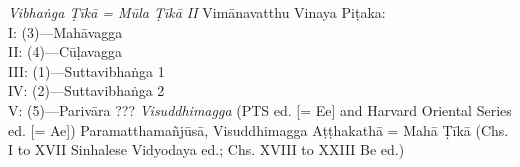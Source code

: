 \begin{thebibliography}{xxxxxxxxxxx}
 \emph{Vibhaṅga Ṭīkā = Mūla Ṭīkā II}
 Vimānavatthu
 Vinaya Piṭaka:\\ I: (3)—Mahāvagga \\ II: (4)—Cūḷavagga \\ III: (1)—Suttavibhaṅga 1 \\ IV: (2)—Suttavibhaṅga 2 \\ V: (5)—Parivāra
 ???
 \emph{Visuddhimagga} (PTS ed. [= Ee] and Harvard Oriental Series ed. [= Ae])
 Paramatthamañjūsā, Visuddhimagga Aṭṭhakathā = Mahā Ṭīkā (Chs. I to XVII Sinhalese Vidyodaya ed.; Chs. XVIII to XXIII Be ed.)
\end{thebibliography}
